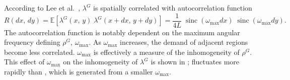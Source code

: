 \documentclass[12pt,dvipsnames]{report}
\DeclareMathOperator{\sinc}{sinc}
\begin{document}
According to Lee et al.~\cite{6554749}, $\lambda^G$ is spatially correlated with autocorrelation function
\begin{equation} \label{eq:sslt_autocorrelation}
R\left( dx,\, dy \right) = \mathbb{E}\left[ \lambda^G\left( x,\, y \right) \; \lambda^G\left( x + dx,\, y + dy \right) \right] = \frac{1}{4L} \; \sinc\left( \omega_{\max} dx \right) \; \sinc\left( \omega_{\max} dy \right).
\end{equation}
The autocorrelation function is notably dependent on the maximum angular frequency defining $\rho^G$, $\omega_{\max}$.  As $\omega_{\max}$ increases, the demand of adjacent regions become less correlated.  $\omega_{\max}$ is effectively a measure of the inhomogeneity of $\rho^G$.  This effect of $\omega_{\max}$ on the inhomogeneity of $\lambda^G$ is shown in ;  fluctuates more rapidly than , which is generated from a smaller $\omega_{\max}$.
\end{document}

